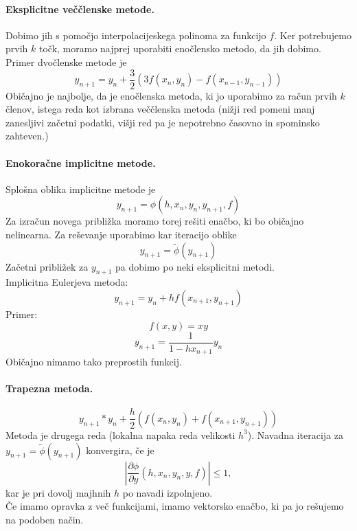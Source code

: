 \documentclass[a4paper]{article}
\newcommand{\pd}[2]{\frac{\partial {#1}}{\partial {#2}}}
\begin{document}
\paragraph{Eksplicitne veččlenske metode.} Dobimo jih s pomočjo interpolacijeskega polinoma za funkcijo $f$. Ker potrebujemo prvih $k$
točk, moramo najprej uporabiti enočlensko metodo, da jih dobimo. Primer dvočlenske metode je
$$y_{n+1} = y_{n} + \frac{3}{2}\left(3f(x_n, y_n) - f(x_{n-1}, y_{n-1})\right)$$
Običajno je najbolje, da je enočlenska metoda, ki jo uporabimo za račun prvih $k$ členov, istega reda kot izbrana veččlenska metoda
(nižji red pomeni manj zanesljivi začetni podatki, višji red pa je nepotrebno časovno in spominsko zahteven.)
\paragraph{Enokoračne implicitne metode.} Splošna oblika implicitne metode je $$y_{n+1} = \phi(h, x_n, y_n, y_{n+1}, f)$$
Za izračun novega približka moramo torej rešiti enačbo, ki bo običajno nelinearna. Za reševanje uporabimo kar iteracijo oblike
$$y_{n+1} = \tilde{\phi}(y_{n+1})$$
Začetni približek za $y_{n+1}$ pa dobimo po neki eksplicitni metodi. \\
Implicitna Eulerjeva metoda:
$$y_{n+1} = y_{n} + hf(x_{n+1}, y_{n+1})$$
Primer:
$$f(x, y) = xy$$
$$y_{n+1} = \frac{1}{1-hx_{n+1}}y_n$$
Običajno nimamo tako preprostih funkcij.
\paragraph{Trapezna metoda.} $$y_{n+1} * y_n + \frac{h}{2}(f(x_n, y_n) + f(x_{n+1}, y_{n+1}))$$
Metoda je drugega reda (lokalna napaka reda velikosti $h^3$).
Navadna iteracija za $y_{n+1} = \tilde{\phi}(y_{n+1})$ konvergira, če je $$\left|\pd{\phi}{y}(h, x_n, y_n, y, f)\right| \leq 1,$$
kar je pri dovolj majhnih $h$ po navadi izpolnjeno. \\
Če imamo opravka z več funkcijami, imamo vektorsko enačbo, ki pa jo rešujemo na podoben način.
\end{document}
